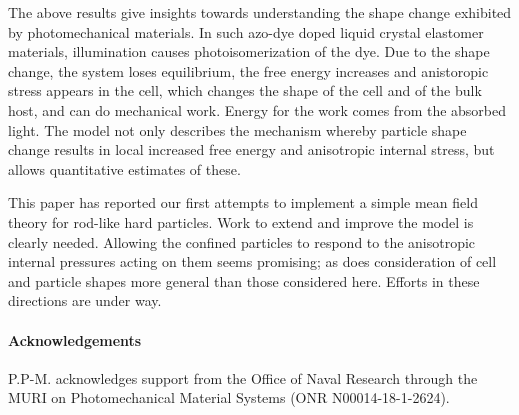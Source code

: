 \documentclass{article}
\begin{document}
The above results give insights towards understanding the shape change
exhibited by photomechanical materials. In such azo-dye doped liquid crystal
elastomer materials, illumination causes photoisomerization of the dye. Due
to the shape change, the system loses equilibrium, the free energy increases
and anistoropic stress appears in the cell, which changes the shape of the
cell and of the bulk host, and can do mechanical work. Energy for the work
comes from the absorbed light. The model not only describes the mechanism
whereby particle shape change results in local increased free energy and
anisotropic internal stress, but allows quantitative estimates of these.

This paper has reported our first attempts to implement a simple mean field
theory for rod-like hard particles. Work to extend and improve the model is
clearly needed. Allowing the confined particles to respond to the
anisotropic internal pressures acting on them seems promising; as does
consideration of cell and particle shapes more general than those considered
here. Efforts in these directions are under way.



\paragraph{Acknowledgements}

P.P-M. acknowledges support from the Office of Naval Research through the
MURI on Photomechanical Material Systems (ONR N00014-18-1-2624). \bigskip
\end{document}
